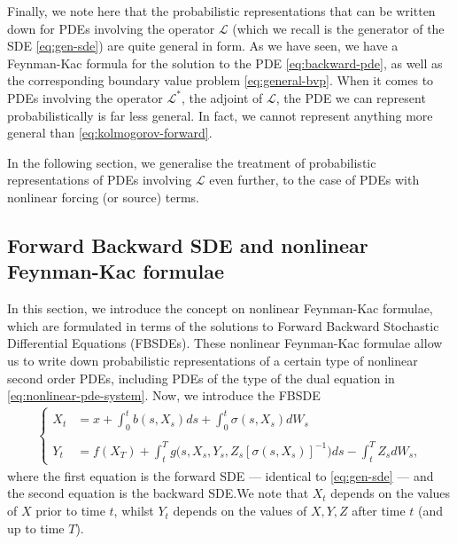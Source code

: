 Finally, we note here that the probabilistic representations that can be written down for PDEs involving the operator $\mathcal{L}$ (which we recall is the generator of the SDE \autoref{eq:gen-sde}) are quite general in form. As we have seen, we have a Feynman-Kac formula for the solution to the PDE \autoref{eq:backward-pde}, as well as the corresponding boundary value problem \autoref{eq:general-bvp}. When it comes to PDEs involving the operator $\mathcal{L^{*}}$, the adjoint of $\mathcal{L}$, the PDE we can represent probabilistically is far less general. In fact, we cannot represent anything more general than \autoref{eq:kolmogorov-forward}.

In the following section, we generalise the treatment of probabilistic representations of PDEs involving $\mathcal{L}$ even further, to the case of PDEs with nonlinear forcing (or source) terms.

\subsection{Forward Backward SDE and nonlinear Feynman-Kac formulae} \label{sec:fbsde-theory}
In this section, we introduce the concept on nonlinear Feynman-Kac formulae, which are formulated in terms of the solutions to Forward Backward Stochastic Differential Equations (FBSDEs). These nonlinear Feynman-Kac formulae allow us to write down probabilistic representations of a certain type of nonlinear second order PDEs, including PDEs of the type of the dual equation in \autoref{eq:nonlinear-pde-system}. 
Now, we introduce the FBSDE
%
\begin{align} 
    \label{eq:fbsde}
    \begin{cases}
    X_t &= x + \int_0^t b(s,X_s) ds + \int_0^t \sigma(s,X_s)dW_s\\
    & \\
    Y_t &= f(X_T) + \int_t^T g\big(s,X_s,Y_s,Z_s[\sigma(s,X_s)]^{-1}\big)ds - \int_t^T Z_s dW_s,
    \end{cases}
\end{align}
%
where the first equation is the forward SDE --- identical to \autoref{eq:gen-sde} --- and the second equation is the backward SDE.\@ We note that $X_t$ depends on the values of $X$ prior to time $t$, whilst $Y_t$ depends on the values of $X,Y,Z$ after time $t$ (and up to time $T$). 

